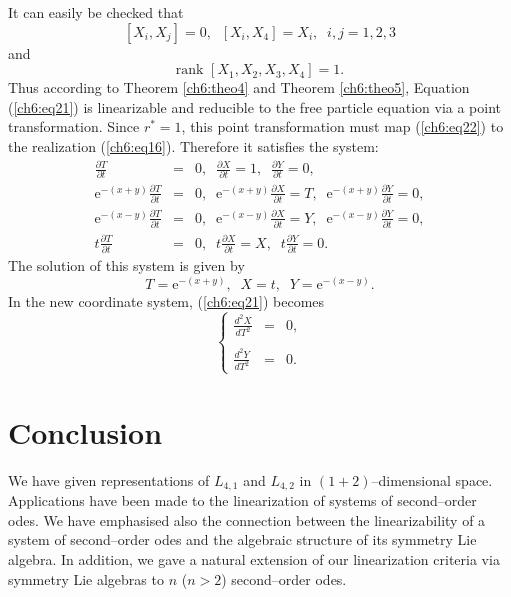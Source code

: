 It can easily be checked that
\[[X_i,X_j]=0,\;\;[X_i,X_4]=X_i,\;\;i,j=1,2,3\]
and
\[\mbox{rank }[X_1,X_2,X_3,X_4]=1.\]
Thus according to Theorem \ref{ch6:theo4} and Theorem \ref{ch6:theo5}, Equation 
(\ref{ch6:eq21}) is linearizable and reducible to the free particle equation
via  a point transformation. Since $r^{*}=1$, this point transformation
must map (\ref{ch6:eq22}) to the realization (\ref{ch6:eq16}). Therefore it
satisfies the system:
\begin{eqnarray*}
\frac{\partial T}{\partial t} &=&0,\;\;
\frac{\partial X}{\partial t} =1,\;\;
\frac{\partial Y}{\partial t} =0,\\
\mbox{e}^{-(x+y)}\frac{\partial T}{\partial t} &=& 0,\;\;
\mbox{e}^{-(x+y)}\frac{\partial X}{\partial t} =T,\;\;
\mbox{e}^{-(x+y)}\frac{\partial Y}{\partial t}= 0,\\
\mbox{e}^{-(x-y)}\frac{\partial T}{\partial t} &= &0,\;\;
\mbox{e}^{-(x-y)}\frac{\partial X}{\partial t} =Y,\;\;
\mbox{e}^{-(x-y)}\frac{\partial Y}{\partial t} =0,\\
t\frac{\partial T}{\partial t} &=&0,\;\;
t\frac{\partial X}{\partial t} =X,\;\;
t\frac{\partial Y}{\partial t} =0.
\end{eqnarray*}
The solution of this system is given by
\[T=\mbox{e}^{-(x+y)},\;\;X=t,\;\;Y=\mbox{e}^{-(x-y)}.\]
In the new coordinate system, (\ref{ch6:eq21}) becomes
\begin{equation}
\label{ch6:eq23}
\left \{ \begin{array}{ccc}
\displaystyle{\frac{d^2X}{dT^2}} & = & 0, \\
& &\\
\displaystyle{\frac{d^2Y}{dT^2}} &= & 0.
\end{array} \right.
\end{equation}
\section{Conclusion}
We have given representations of $L_{4,1}$ and $L_{4,2}$ in 
$(1+2)$--dimensional  space. Applications have been made to 
the linearization of systems of second--order odes. We have
emphasised also the connection between the linearizability of a system of 
second--order odes  and the algebraic structure of its symmetry Lie 
algebra. In addition, we gave a natural extension of our linearization criteria
via symmetry Lie algebras to $n$ ($n > 2$) second--order odes.

%

